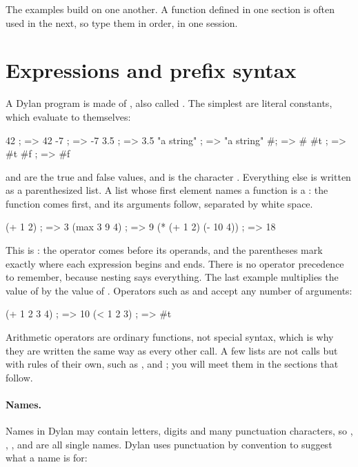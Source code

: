 \begin{notebox}
The examples build on one another. A function defined in one section is
often used in the next, so type them in order, in one session.
\end{notebox}

\section{Expressions and prefix syntax}\label{sec:tut-syntax}

A Dylan program is made of , also called
. The simplest are literal constants, which evaluate to
themselves:

\begin{dylan}
42          ; => 42
-7          ; => -7
3.5         ; => 3.5
"a string"  ; => "a string"
#\a         ; => #\a
#t          ; => #t
#f          ; => #f
\end{dylan}

 and  are the true and false values, and
 is the character . Everything else is
written as a parenthesized list. A list whose first element names a
function is a : the function comes first, and its arguments
follow, separated by white space.

\begin{dylan}
(+ 1 2)                ; => 3
(max 3 9 4)            ; => 9
(* (+ 1 2) (- 10 4))   ; => 18
\end{dylan}

This is : the operator comes before its operands, and
the parentheses mark exactly where each expression begins and ends. There
is no operator precedence to remember, because nesting says everything.
The last example multiplies the value of  by the value of
. Operators such as \code{+} and  accept any
number of arguments:

\begin{dylan}
(+ 1 2 3 4)   ; => 10
(< 1 2 3)     ; => #t
\end{dylan}

Arithmetic operators are ordinary functions, not special syntax, which is
why they are written the same way as every other call. A few lists are
not calls but  with rules of their own, such as
,  and ; you will meet them in the
sections that follow.

\paragraph{Names.} Names in Dylan may contain letters, digits and many
punctuation characters, so , , ,
 and  are all single names. Dylan uses
punctuation by convention to suggest what a name is for:

